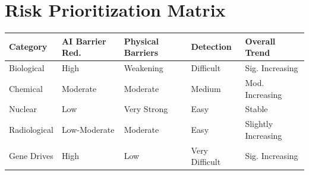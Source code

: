 \documentclass[11pt,letterpaper]{article}
\begin{document}
\appendix

\clearpage
\section{Risk Prioritization Matrix}

\begin{center}
\small
\begin{tabular}{L{2.5cm}L{2.5cm}L{2.5cm}L{2cm}L{3cm}}
\toprule
\textbf{Category} & \textbf{AI Barrier Red.} & \textbf{Physical Barriers} & \textbf{Detection} & \textbf{Overall Trend} \\
\midrule
Biological & High & Weakening & Difficult & Sig. Increasing \\
Chemical & Moderate & Moderate & Medium & Mod. Increasing \\
Nuclear & Low & Very Strong & Easy & Stable \\
Radiological & Low-Moderate & Moderate & Easy & Slightly Increasing \\
Gene Drives & High & Low & Very Difficult & Sig. Increasing \\
\bottomrule
\end{tabular}
\end{center}

\vspace{0.6em}
\end{document}

